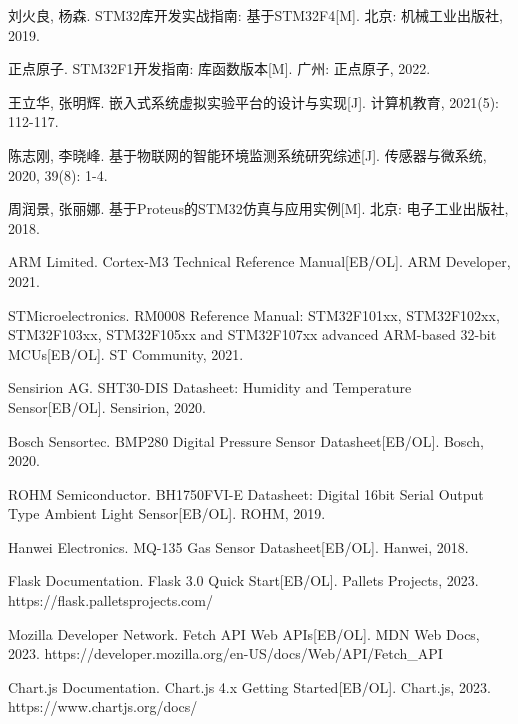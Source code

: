 \documentclass[12pt,a4paper]{ctexart}
\begin{document}
\begin{enumerate}[label={[\arabic*]},leftmargin=2em,itemsep=0.3em]
    \item 刘火良, 杨森. STM32库开发实战指南: 基于STM32F4[M]. 北京: 机械工业出版社, 2019.
    
    \item 正点原子. STM32F1开发指南: 库函数版本[M]. 广州: 正点原子, 2022.
    
    \item 王立华, 张明辉. 嵌入式系统虚拟实验平台的设计与实现[J]. 计算机教育, 2021(5): 112-117.
    
    \item 陈志刚, 李晓峰. 基于物联网的智能环境监测系统研究综述[J]. 传感器与微系统, 2020, 39(8): 1-4.
    
    \item 周润景, 张丽娜. 基于Proteus的STM32仿真与应用实例[M]. 北京: 电子工业出版社, 2018.
    
    \item ARM Limited. Cortex-M3 Technical Reference Manual[EB/OL]. ARM Developer, 2021.
    
    \item STMicroelectronics. RM0008 Reference Manual: STM32F101xx, STM32F102xx, STM32F103xx, STM32F105xx and STM32F107xx advanced ARM-based 32-bit MCUs[EB/OL]. ST Community, 2021.
    
    \item Sensirion AG. SHT30-DIS Datasheet: Humidity and Temperature Sensor[EB/OL]. Sensirion, 2020.
    
    \item Bosch Sensortec. BMP280 Digital Pressure Sensor Datasheet[EB/OL]. Bosch, 2020.
    
    \item ROHM Semiconductor. BH1750FVI-E Datasheet: Digital 16bit Serial Output Type Ambient Light Sensor[EB/OL]. ROHM, 2019.
    
    \item Hanwei Electronics. MQ-135 Gas Sensor Datasheet[EB/OL]. Hanwei, 2018.
    
    \item Flask Documentation. Flask 3.0 Quick Start[EB/OL]. Pallets Projects, 2023. https://flask.palletsprojects.com/
    
    \item Mozilla Developer Network. Fetch API Web APIs[EB/OL]. MDN Web Docs, 2023. https://developer.mozilla.org/en-US/docs/Web/API/Fetch\_API
    
    \item Chart.js Documentation. Chart.js 4.x Getting Started[EB/OL]. Chart.js, 2023. https://www.chartjs.org/docs/
    

\end{enumerate}
\end{document}
